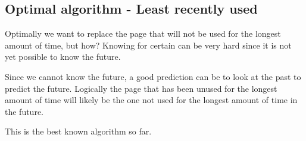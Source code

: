 \subsection{Optimal algorithm - Least recently used}
Optimally we want to replace the page that will not be used for the longest amount of time, but how? Knowing for certain can be very hard since it is not yet possible to know the future.

Since we cannot know the future, a good prediction can be to look at the past to predict the future. Logically the page that has been unused for the longest amount of time will likely be the one not used for the longest amount of time in the future.

This is the best known algorithm so far.

